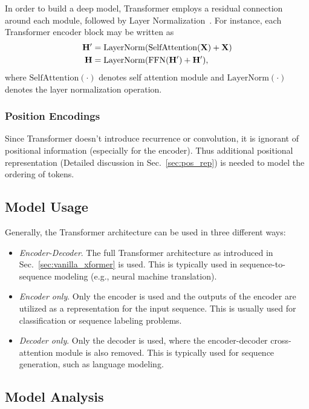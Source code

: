 \documentclass[manuscript,acmsmall,screen,nonacm]{acmart}
\theoremstyle{definition}
\begin{document}
In order to build a deep model, Transformer employs a residual connection~\cite{he16resnet} around each module, followed by Layer Normalization~\cite{ba16layernorm}. For instance, each Transformer encoder block may be written as
\begin{align}
    \mathbf{H}'&=\mathrm{LayerNorm}(\mathrm{SelfAttention}(\mathbf{X})+\mathbf{X})\\
    \mathbf{H}&=\mathrm{LayerNorm}(\mathrm{FFN}(\mathbf{H}')+\mathbf{H}'),
\end{align}
where $\mathrm{SelfAttention}(\cdot)$ denotes self attention module and $\mathrm{LayerNorm}(\cdot)$ denotes the layer normalization operation.

\subsubsection{Position Encodings}
Since Transformer doesn't introduce recurrence or convolution, it is ignorant of positional information (especially for the encoder). Thus additional positional representation (Detailed discussion in Sec.~\ref{sec:pos_rep}) is needed to model the ordering of tokens.
\subsection{Model Usage}

Generally, the Transformer architecture can be used in three different ways:
\begin{itemize}
    \item \textit{Encoder-Decoder}. The full Transformer architecture as introduced in Sec.~\ref{sec:vanilla_xformer} is used. This is typically used in sequence-to-sequence modeling (e.g., neural machine translation).
    \item \textit{Encoder only}. Only the encoder is used and the outputs of the encoder are utilized as a representation for the input sequence. This is usually used for classification or sequence labeling problems.
    \item \textit{Decoder only}. Only the decoder is used, where the encoder-decoder cross-attention module is also removed. This is typically used for sequence generation, such as language modeling.
\end{itemize}

\subsection{Model Analysis}\label{sec:model-analysis}
\end{document}
